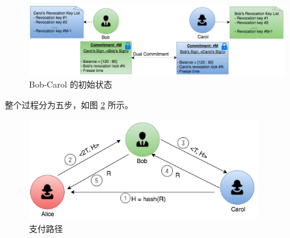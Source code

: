 \begin{figure}[h!]
    \centering
    \includegraphics[width=12cm, keepaspectratio]{../images/bob_carol_1.png}
    \caption{Bob-Carol 的初始状态}
    \label{fig:htlc_bob_carol_1}
\end{figure}

\newpage
整个过程分为五步，如图 \ref{fig:htlc_path} 所示。

\begin{figure}[h!]
    \centering
    \includegraphics[width=10cm, keepaspectratio]{../images/payment_path.png}
    \caption{支付路径}
    \label{fig:htlc_path}
\end{figure}


